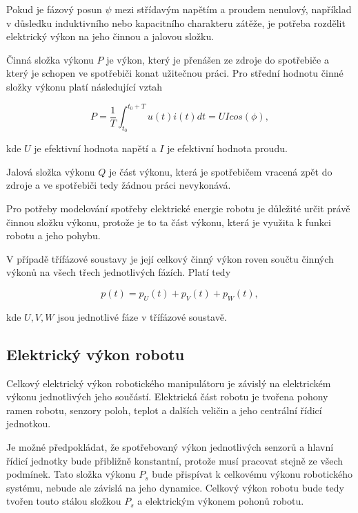 Pokud je fázový posun $\psi$ mezi střídavým napětím a proudem nenulový, například v důsledku induktivního nebo kapacitního charakteru zátěže, je potřeba rozdělit elektrický výkon na jeho činnou a jalovou složku. 

Činná složka výkonu $P$ je výkon, který je přenášen ze zdroje do spotřebiče a který je schopen ve spotřebiči konat užitečnou práci. Pro střední hodnotu činné složky výkonu platí následující vztah

\begin{equation}
P = \frac{1}{T} \int_{t_0}^{t_0 + T} u(t)i(t)dt = UIcos(\phi),
\label{act_power_eq}
\end{equation}  

kde $U$ je efektivní hodnota napětí a $I$ je efektivní hodnota proudu.

Jalová složka výkonu $Q$ je část výkonu, která je spotřebičem vracená zpět do zdroje a ve spotřebiči tedy žádnou práci nevykonává.

Pro potřeby modelování spotřeby elektrické energie robotu je důležité určit právě činnou složku výkonu, protože je to ta část výkonu, která je využita k funkci robotu a jeho pohybu. 

V případě třífázové soustavy je její celkový činný výkon roven součtu činných výkonů na všech třech jednotlivých fázích. Platí tedy

\begin{equation}
p(t) = p_U(t) + p_V(t) + p_W(t),
\label{3ph_power_eq}
\end{equation}  

kde $U,V,W$ jsou jednotlivé fáze v třífázové soustavě.

\subsection{Elektrický výkon robotu}

Celkový elektrický výkon robotického manipulátoru je závislý na elektrickém výkonu jednotlivých jeho součástí. Elektrická část robotu je tvořena pohony ramen robotu, senzory poloh, teplot a dalších veličin a jeho centrální řídicí jednotkou. 

Je možné předpokládat, že spotřebovaný výkon jednotlivých senzorů a hlavní řídicí jednotky bude přibližně konstantní, protože musí pracovat stejně ze všech podmínek. Tato složka výkonu $P_s$ bude přispívat k celkovému výkonu robotického systému, nebude ale závislá na jeho dynamice. Celkový výkon robotu bude tedy tvořen touto stálou složkou $P_s$ a elektrickým výkonem pohonů robotu.

